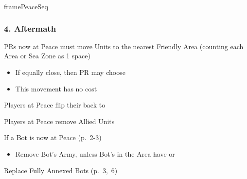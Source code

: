 \documentclass[10pt]{article}
\begin{document}
\begin{dynamiccontents*}{framePeaceSeq}
\begin{multicols}{2}
		\subsubsection*{4. Aftermath}
		\begin{itemize}
			\item PRs now at Peace must move Units to the nearest Friendly Area (counting each Area or Sea Zone as 1 space)
			\begin{itemize}
				\item If equally close, then PR may choose
				\item This movement has no cost
			\end{itemize}
			\item Players at Peace flip their \activeallies back to \alliance
			\item Players at Peace remove Allied Units
			{\botrules
			\item If a Bot is now at Peace (p.~2-3)
			\begin{itemize}
				\item Remove Bot's Army, unless Bot's \towns in the Area have \unrest or \rebeltown
			\end{itemize}
			\item Replace Fully Annexed Bots (p.~3,~6)
			}
		\end{itemize}
	\end{multicols}
\end{dynamiccontents*}%
\end{document}
